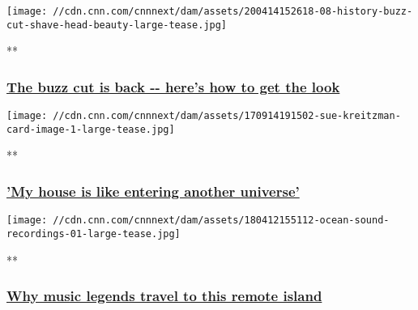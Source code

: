 \href{/videos/beauty/2020/04/16/coronavirus-head-shave-tips-lon-orig.cnn/video/playlists/cnn-style/}{}

\texttt{[image: //cdn.cnn.com/cnnnext/dam/assets/200414152618-08-history-buzz-cut-shave-head-beauty-large-tease.jpg]}

**

\hypertarget{the-buzz-cut-is-back----heres-how-to-get-the-look}{%
\subsubsection{\texorpdfstring{\href{/videos/beauty/2020/04/16/coronavirus-head-shave-tips-lon-orig.cnn/video/playlists/cnn-style/}{The
buzz cut is back -\/- here's how to get the
look}}{The buzz cut is back -\/- here's how to get the look}}\label{the-buzz-cut-is-back----heres-how-to-get-the-look}}

\href{/videos/arts/2017/09/07/the-adorned-sue-kreitzman-style-orig.cnn/video/playlists/cnn-style/}{}

\texttt{[image: //cdn.cnn.com/cnnnext/dam/assets/170914191502-sue-kreitzman-card-image-1-large-tease.jpg]}

**

\hypertarget{my-house-is-like-entering-another-universe}{%
\subsubsection{\texorpdfstring{\href{/videos/arts/2017/09/07/the-adorned-sue-kreitzman-style-orig.cnn/video/playlists/cnn-style/}{'My
house is like entering another
universe'}}{'My house is like entering another universe'}}\label{my-house-is-like-entering-another-universe}}

\href{/videos/arts/2018/04/13/masters-of-experience-ocean-sound-studio-giske-style-orig.cnn/video/playlists/cnn-style/}{}

\texttt{[image: //cdn.cnn.com/cnnnext/dam/assets/180412155112-ocean-sound-recordings-01-large-tease.jpg]}

**

\hypertarget{why-music-legends-travel-to-this-remote-island}{%
\subsubsection{\texorpdfstring{\href{/videos/arts/2018/04/13/masters-of-experience-ocean-sound-studio-giske-style-orig.cnn/video/playlists/cnn-style/}{Why
music legends travel to this remote
island}}{Why music legends travel to this remote island}}\label{why-music-legends-travel-to-this-remote-island}}

